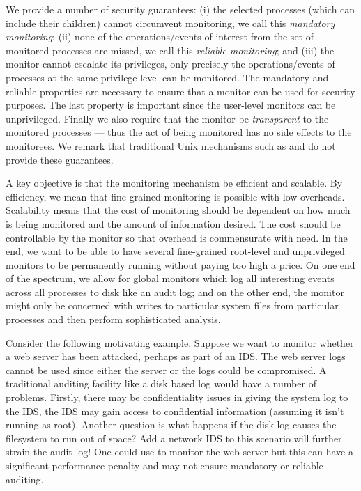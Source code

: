 We provide a number of security guarantees:
(i) the selected processes (which can include their children)
cannot circumvent monitoring, we call this {\em mandatory monitoring};
(ii) none of the operations/events of interest from the set of monitored
processes are missed, we call this {\em reliable monitoring};
and 
(iii) the monitor cannot escalate its privileges, only precisely
the operations/events of processes at the same privilege level can
be monitored.
The mandatory and reliable properties are necessary to ensure that a monitor
can be used for security purposes.
The last property is important since the user-level monitors can be 
unprivileged.
Finally we also require that the monitor be {\em transparent} to the monitored
processes --- thus the act of being monitored has no side effects to the
monitorees.
We remark that traditional Unix mechanisms such as  and 
 do not provide these guarantees.

A key objective is that the monitoring mechanism be efficient and scalable.
By efficiency, we mean that fine-grained monitoring is possible with low
overheads.
Scalability means that the cost of monitoring should be dependent on
how much is being monitored and the amount of information desired.
The cost should be controllable by the monitor so that overhead is
commensurate with need.
In the end, we want to be able to have several fine-grained root-level and 
unprivileged monitors to be permanently running without 
paying too high a price. 
On one end of the spectrum, we allow for global monitors which
log all interesting events across all processes to disk like 
an audit log; and on the other end, the monitor might only be concerned
with writes to particular system files from particular processes
and then perform sophisticated analysis.

Consider the following motivating example.
Suppose we want to monitor whether a web server has been attacked,
perhaps as part of an IDS.
The web server logs cannot be used since either
the server or the logs could be compromised. 
A traditional auditing facility like a disk based log would 
have a number of problems. Firstly, there may be confidentiality
issues in giving the system log to the IDS, the IDS may gain access to
confidential information (assuming it isn't running as root).
Another question is what happens if the disk log 
causes the filesystem to run out of space?
Add a network IDS to this scenario will further strain the audit log!
One could use  to monitor the web server 
but this can have a significant performance penalty and may
not ensure mandatory or reliable auditing.

